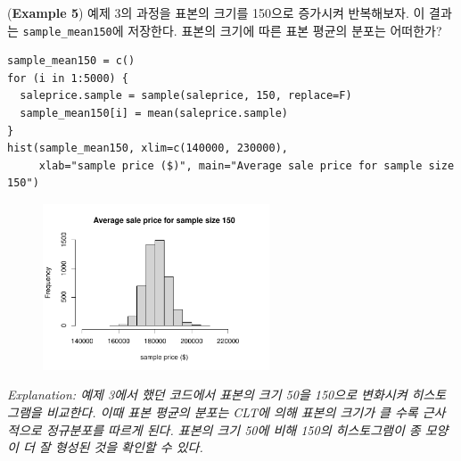 \documentclass{article}
\begin{document}
\newpage
(\textbf{Example 5}) 예제 3의 과정을 표본의 크기를 150으로 증가시켜 반복해보자. 이 결과는
\texttt{sample\_mean150}에 저장한다. 표본의 크기에 따른 표본 평균의 분포는 어떠한가?
\begin{lstlisting}[style={r-style}]
sample_mean150 = c()
for (i in 1:5000) {
  saleprice.sample = sample(saleprice, 150, replace=F)
  sample_mean150[i] = mean(saleprice.sample)
}
hist(sample_mean150, xlim=c(140000, 230000),
     xlab="sample price ($)", main="Average sale price for sample size 150")
\end{lstlisting}
\begin{figure}[htb!]
    \centering
    \includegraphics[width=0.6\textwidth]{fig/ex5.pdf}
\end{figure}
\emph{Explanation: 예제 3에서 했던 코드에서 표본의 크기 50을 150으로 변화시켜 히스토그램을 비교한다. 이때 표본 평균의 분포는 CLT에 의해 표본의 크기가 클 수록 근사적으로 정규분포를 따르게 된다. 표본의 크기 50에 비해 150의 히스토그램이 종 모양이 더 잘 형성된 것을 확인할 수 있다. } \\
\end{document}
